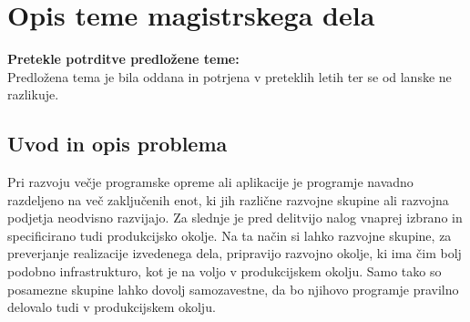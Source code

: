 \documentclass[a4paper, 12pt]{article}
\newcommand\cmnt[1]{\textcolor{munsell}{#1}}
\begin{document}
\section{Opis teme magistrskega dela}


\textbf{Pretekle potrditve predložene teme:}\\
Predložena tema je bila oddana in potrjena v preteklih letih ter se od lanske ne razlikuje.

\subsection{Uvod in opis problema}

Pri razvoju večje programske opreme ali aplikacije je programje navadno razdeljeno na več zaključenih enot, ki jih različne razvojne skupine ali razvojna podjetja neodvisno razvijajo. Za slednje je pred delitvijo nalog vnaprej izbrano in specificirano tudi produkcijsko okolje. Na ta način si lahko razvojne skupine, za preverjanje realizacije izvedenega dela, pripravijo razvojno okolje, ki ima čim bolj podobno infrastrukturo, kot je na voljo v produkcijskem okolju. Samo tako so posamezne skupine lahko dovolj samozavestne, da bo njihovo programje pravilno delovalo tudi v produkcijskem okolju.
\end{document}
